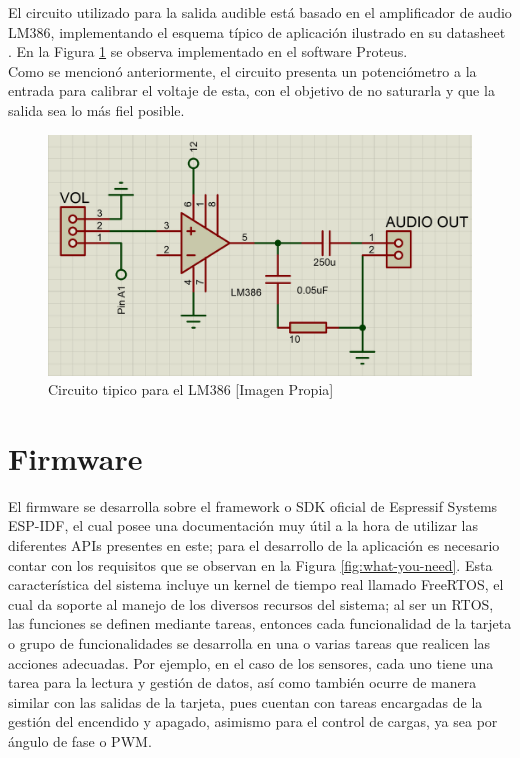 		El circuito utilizado para la salida audible está basado en el amplificador de audio LM386, implementando el esquema típico de aplicación ilustrado en su datasheet \cite{LM386}. En la Figura \ref{fig:AUD} se observa implementado en el software Proteus.\\
		
		Como se mencionó anteriormente, el circuito presenta un potenciómetro a la entrada para calibrar el voltaje de esta, con el objetivo de no saturarla y que la salida sea lo más fiel posible.\\
		
		\begin{figure}[H]
			\centering
			\caption{Circuito tipico para el LM386 [Imagen Propia]}
			\label{fig:AUD}
			\includegraphics[width=0.7\linewidth]{Imagenes/AUD}
		\end{figure}		
				
\section{Firmware}

El firmware se desarrolla sobre el framework o SDK oficial de Espressif Systems ESP-IDF, el cual posee una documentación \cite{ES} muy útil a la hora de utilizar las diferentes APIs presentes en este; para el desarrollo de la aplicación es necesario contar con los requisitos que se observan en la Figura \ref{fig:what-you-need}. Esta característica del sistema incluye un kernel de tiempo real llamado FreeRTOS, el cual da soporte al manejo de los diversos recursos del sistema; al ser un RTOS, las funciones se definen mediante tareas, entonces cada funcionalidad de la tarjeta o grupo de funcionalidades se desarrolla en una o varias tareas que realicen las acciones adecuadas. Por ejemplo, en el caso de los sensores, cada uno tiene una tarea para la lectura y gestión de datos, así como también ocurre de manera similar con las salidas de la tarjeta, pues cuentan con tareas encargadas de la gestión del encendido y apagado, asimismo para el control de cargas, ya sea por ángulo de fase o PWM.\\

